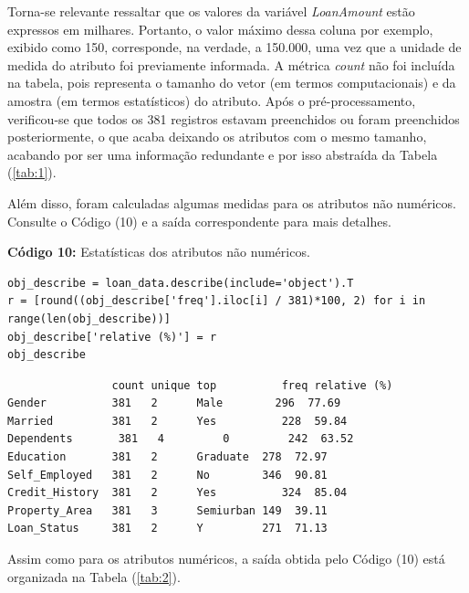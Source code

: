 \documentclass[a4paper,12pt]{article} %
\begin{document}
Torna-se relevante ressaltar que os valores da variável \textit{LoanAmount} estão expressos em milhares. Portanto, o valor máximo dessa coluna por exemplo, exibido como 150, corresponde, na verdade, a 150.000, uma vez que a unidade de medida do atributo foi previamente informada. A métrica \textit{count} não foi incluída na tabela, pois representa o tamanho do vetor (em termos computacionais) e da amostra (em termos estatísticos) do atributo. Após o pré-processamento, verificou-se que todos os 381 registros estavam preenchidos ou foram preenchidos posteriormente, o que acaba deixando os atributos com o mesmo tamanho, acabando por ser uma informação redundante e por isso abstraída da Tabela (\ref{tab:1}).

Além disso, foram calculadas algumas medidas para os atributos não numéricos. Consulte o Código (10) e a saída correspondente para mais detalhes.
\begin{center}
\textbf{Código 10:} Estatísticas dos atributos não numéricos.
\begin{verbatim}
obj_describe = loan_data.describe(include='object').T
r = [round((obj_describe['freq'].iloc[i] / 381)*100, 2) for i in range(len(obj_describe))]
obj_describe['relative (%)'] = r
obj_describe
\end{verbatim}
\end{center}
\begin{verbatim}
                count unique top	      freq relative (%)
Gender          381   2	     Male	     296  77.69
Married         381   2	     Yes	      228  59.84
Dependents	     381   4	     0         242  63.52
Education       381	  2	     Graduate  278  72.97
Self_Employed   381	  2	     No	       346  90.81
Credit_History  381	  2	     Yes	      324  85.04
Property_Area   381	  3	     Semiurban 149  39.11
Loan_Status     381	  2	     Y         271  71.13
\end{verbatim}

Assim como para os atributos numéricos, a saída obtida pelo Código (10) está organizada na Tabela (\ref{tab:2}).
\end{document}

